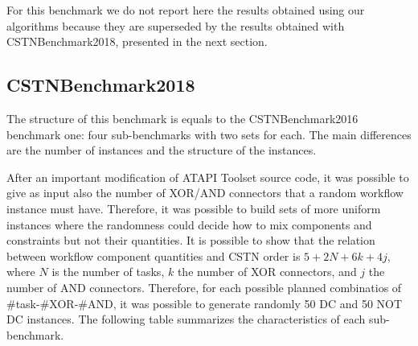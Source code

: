 \documentclass[a4paper,11pt]{article}
\begin{document}
For this benchmark we do not report here the results obtained using our algorithms because they are superseded by the results obtained with CSTNBenchmark2018, presented in the next section.


\subsection{CSTNBenchmark2018}

The structure of this benchmark is equals to the CSTNBenchmark2016 benchmark one: four sub-benchmarks with two sets for each.
The main differences are the number of instances and the structure of the instances.

After an important modification of ATAPI Toolset source code, it was possible to give as input also the number of XOR\slash AND connectors that a random workflow instance must have.
Therefore, it was possible to build sets of more uniform instances where the randomness could decide how to mix components and constraints but not their quantities.
It is possible to show that the relation between workflow component quantities and CSTN order is $5+2N+6k+4j$, where $N$ is the number of tasks, $k$ the number of XOR connectors, and $j$ the number of AND connectors.
Therefore, for each possible planned combinatios of \#task-\#XOR-\#AND, it was possible to generate randomly 50 DC and 50 NOT DC instances.
The following table summarizes the characteristics of each sub-benchmark.
\end{document}
